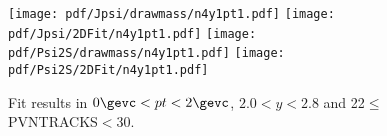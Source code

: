 \begin{figure}[H]
\begin{center}
\texttt{[image: pdf/Jpsi/drawmass/n4y1pt1.pdf]}
\texttt{[image: pdf/Jpsi/2DFit/n4y1pt1.pdf]}
\vspace*{-0.5cm}
\texttt{[image: pdf/Psi2S/drawmass/n4y1pt1.pdf]}
\texttt{[image: pdf/Psi2S/2DFit/n4y1pt1.pdf]}
\vspace*{-0.5cm}
\end{center}
\caption{Fit results in $0\gevc<pt<2\gevc$, $2.0<y<2.8$ and 22$\leq$PVNTRACKS$<$30.}
\label{Fitn4y1pt1}
\end{figure}
